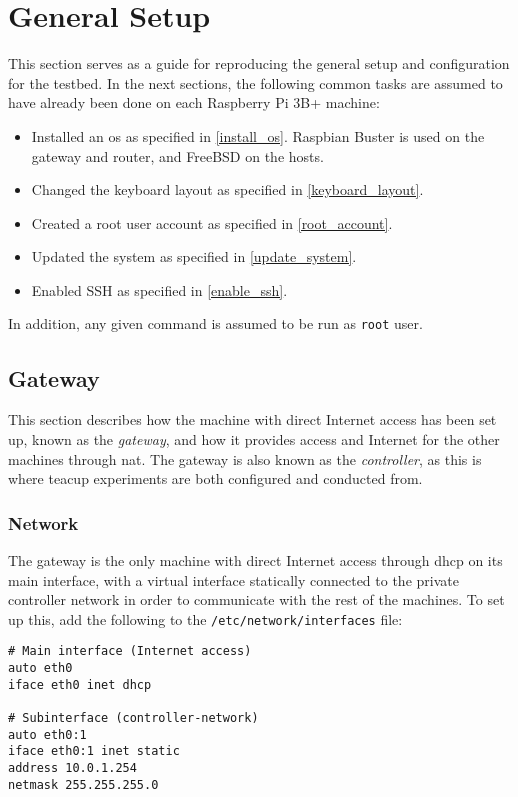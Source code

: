 \section{General Setup}

This section serves as a guide for reproducing the general setup and configuration for the testbed. In the next sections, the following common tasks are assumed to have already been done on each Raspberry Pi 3B+ machine:

\begin{itemize}
    \item Installed an \gls{os} as specified in \ref{install_os}. Raspbian Buster is used on the gateway and router, and FreeBSD on the hosts.
    \item Changed the keyboard layout as specified in \ref{keyboard_layout}.
    \item Created a root user account as specified in \ref{root_account}.
    \item Updated the system as specified in \ref{update_system}.
    \item Enabled SSH as specified in \ref{enable_ssh}.
\end{itemize}

In addition, any given command is assumed to be run as \lstinline{root} user.

\subsection{Gateway}

This section describes how the machine with direct Internet access has been set up, known as the \textit{gateway}, and how it provides access and Internet for the other machines through \gls{nat}. The gateway is also known as the \textit{controller}, as this is where \gls{teacup} experiments are both configured and conducted from.


\subsubsection{Network}

The gateway is the only machine with direct Internet access through \gls{dhcp} on its main interface, with a virtual interface statically connected to the private controller network in order to communicate with the rest of the machines. To set up this, add the following to the \lstinline{/etc/network/interfaces} file:

\begin{verbatim}
# Main interface (Internet access)
auto eth0
iface eth0 inet dhcp

# Subinterface (controller-network)
auto eth0:1
iface eth0:1 inet static
address 10.0.1.254
netmask 255.255.255.0
\end{verbatim}

